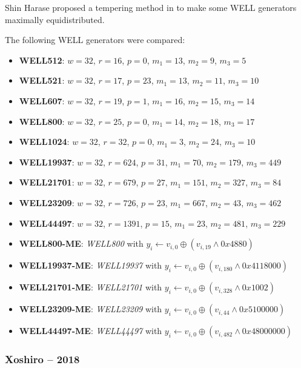     Shin Harase proposed a tempering method in \cite{Harase:2009} to make some WELL generators maximally equidistributed.

    The following WELL generators were compared:
    \begin{itemize}
        \itemsep0em
        \item \textbf{WELL512}: $w = 32$, $r = 16$, $p = 0$, $m_1 = 13$, $m_2 = 9$, $m_3 = 5$
        \item \textbf{WELL521}: $w = 32$, $r = 17$, $p = 23$, $m_1 = 13$, $m_2 = 11$, $m_3 = 10$
        \item \textbf{WELL607}: $w = 32$, $r = 19$, $p = 1$, $m_1 = 16$, $m_2 = 15$, $m_3 = 14$
        \item \textbf{WELL800}: $w = 32$, $r = 25$, $p = 0$, $m_1 = 14$, $m_2 = 18$, $m_3 = 17$
        \item \textbf{WELL1024}: $w = 32$, $r = 32$, $p = 0$, $m_1 = 3$, $m_2 = 24$, $m_3 = 10$
        \item \textbf{WELL19937}: $w = 32$, $r = 624$, $p = 31$, $m_1 = 70$, $m_2 = 179$, $m_3 = 449$
        \item \textbf{WELL21701}: $w = 32$, $r = 679$, $p = 27$, $m_1 = 151$, $m_2 = 327$, $m_3 = 84$
        \item \textbf{WELL23209}: $w = 32$, $r = 726$, $p = 23$, $m_1 = 667$, $m_2 = 43$, $m_3 = 462$
        \item \textbf{WELL44497}: $w = 32$, $r = 1391$, $p = 15$, $m_1 = 23$, $m_2 = 481$, $m_3 = 229$
        \item \textbf{WELL800-ME}: \textit{WELL800} with $y_i \leftarrow v_{i, 0} \oplus \left(v_{i, 19} \land 0x4880\right)$
        \item \textbf{WELL19937-ME}: \textit{WELL19937} with $y_i \leftarrow v_{i, 0} \oplus \left(v_{i, 180} \land 0x4118000\right)$
        \item \textbf{WELL21701-ME}: \textit{WELL21701} with $y_i \leftarrow v_{i, 0} \oplus \left(v_{i, 328} \land 0x1002\right)$
        \item \textbf{WELL23209-ME}: \textit{WELL23209} with $y_i \leftarrow v_{i, 0} \oplus \left(v_{i, 44} \land 0x5100000\right)$
        \item \textbf{WELL44497-ME}: \textit{WELL44497} with $y_i \leftarrow v_{i, 0} \oplus \left(v_{i, 482} \land 0x48000000\right)$
    \end{itemize}

\subsubsection[Xoshiro -- 2018]{Xoshiro -- 2018} \label{subsubsec:xoshiro}

